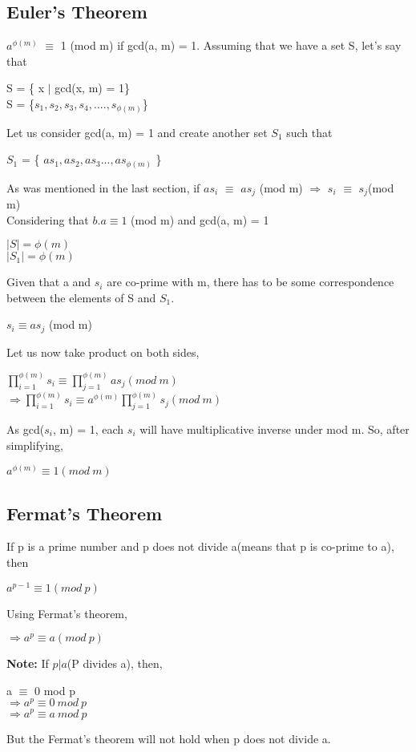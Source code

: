 \documentclass[11pt]{article}
\begin{document}
\begin{itemize}
    \subsection{Euler's Theorem}
    $a^{\phi(m)}$ $\equiv$ 1 (mod m) if gcd(a, m) = 1.
    Assuming that we have a set S, let's say that
    \begin{center}
        S = \{ x $|$ gcd(x, m) = 1\}\\
        S = \{$s_1, s_2, s_3, s_4,....,s_{\phi(m)}$\}
    \end{center}
    Let us consider gcd(a, m) = 1 and create another set $S_1$ such that
    \begin{center}
        $S_1$ = \{ $as_1, as_2, as_3...,as_{\phi(m)}$ \}
    \end{center}
    As was mentioned in the last section, if $as_i$ $\equiv$ $as_j$ (mod m) $\Rightarrow$ $s_i$ $\equiv$ $s_j$(mod m)\\
    Considering that $b.a \equiv 1 $ (mod m) and gcd(a, m) = 1
    \begin{center}
        $|S| = \phi(m)$\\
        $|S_1| = \phi(m)$
    \end{center}
    Given that a and $s_i$ are co-prime with m, there has to be some correspondence between the elements of S and $S_1$.
    \begin{center}
        $s_i \equiv as_j$ (mod m)
    \end{center}
    Let us now take product on both sides,
    \begin{center}
        $ \prod_{i=1}^{\phi(m)} s_i   \equiv  \prod_{j=1}^{\phi(m)} as_j  (mod\ m)$ \\
        \vspace{2mm}
        $\Rightarrow \prod_{i=1}^{\phi(m)} s_i  \equiv  a^{\phi(m)}\prod_{j=1}^{\phi(m)} s_j  (mod\ m)$
    \end{center}
    As gcd($s_i$, m) = 1, each $s_i$ will have multiplicative inverse under mod m. So, after simplifying,
    \begin{center}
        $a^{\phi(m)} \equiv 1 ( mod\ m)$
    \end{center}
    \subsection{Fermat's Theorem}
    If p is a prime number and p does not divide a(means that p is co-prime to a), then
    \begin{center}
        $a^{p-1} \equiv 1 (mod\ p)$
    \end{center}
    Using Fermat's theorem,
    \begin{center}
        $\Rightarrow a^p \equiv a (mod \ p)$
    \end{center}
    \textbf{Note:} If $p|a$(P divides a), then,
    \begin{center}
        a $\equiv$ 0 mod p\\
        $\Rightarrow a^p \equiv 0 \ mod\ p$\\
        $\Rightarrow a^p \equiv a \ mod\ p$\\
    \end{center}
    But the Fermat's theorem will not hold when p does not divide a.
\end{itemize}
\end{document}

